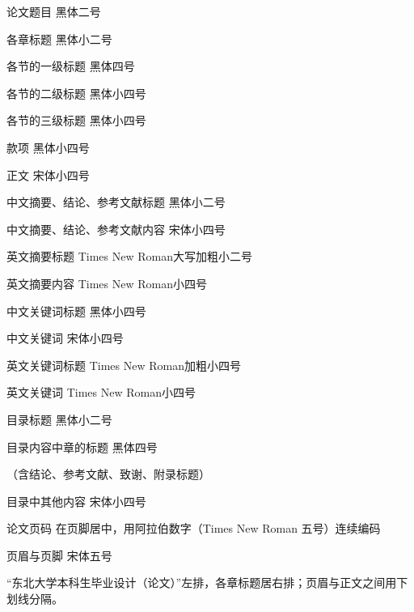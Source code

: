 论文题目 \hspace{6cm} 黑体二号

各章标题 \hspace{6cm} 黑体小二号

各节的一级标题 \hspace{5cm} 黑体四号

各节的二级标题 \hspace{5cm} 黑体小四号

各节的三级标题 \hspace{5cm}黑体小四号

款项 \hspace{7cm} 黑体小四号

正文 \hspace{7cm} 宋体小四号

中文摘要、结论、参考文献标题 \hspace{2cm}黑体小二号

中文摘要、结论、参考文献内容 \hspace{2cm} 宋体小四号

英文摘要标题 \hspace{5cm} Times New Roman大写加粗小二号

英文摘要内容 \hspace{5cm} Times New Roman小四号

中文关键词标题 \hspace{5cm} 黑体小四号

中文关键词 \hspace{6cm} 宋体小四号

英文关键词标题 \hspace{5cm} Times New Roman加粗小四号

英文关键词 \hspace{6cm} Times New Roman小四号

目录标题 \hspace{6cm} 黑体小二号

目录内容中章的标题 \hspace{4cm} 黑体四号

（含结论、参考文献、致谢、附录标题）

目录中其他内容 \hspace{5cm} 宋体小四号

论文页码 \hspace{2cm} 在页脚居中，用阿拉伯数字（Times New Roman 五号）连续编码

页眉与页脚 \hspace{6cm} 宋体五号

“东北大学本科生毕业设计（论文）”左排，各章标题居右排；页眉与正文之间用下划线分隔。

